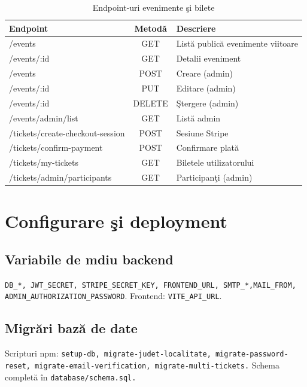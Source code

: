 \begin{table}[htbp]
	\centering
	\begin{tabular}{|>{\ttfamily}p{5cm}|c|l|}
		\hline
		\textbf{Endpoint} & \textbf{Metod\u a} & \textbf{Descriere} \\ \hline
		/events & GET & List\u a public\u a evenimente viitoare \\ \hline
		/events/:id & GET & Detalii eveniment \\ \hline
		/events & POST & Creare (admin) \\ \hline
		/events/:id & PUT & Editare (admin) \\ \hline
		/events/:id & DELETE & \c Stergere (admin) \\ \hline
		/events/admin/list & GET & List\u a admin \\ \hline
		/tickets/create-\newline checkout-session & POST & Sesiune Stripe \\ \hline
		/tickets/confirm-\newline payment & POST & Confirmare plat\u a \\ \hline
		/tickets/my-tickets & GET & Biletele utilizatorului \\ \hline
		/tickets/admin/\newline participants & GET & Participan\c ti (admin) \\ \hline
	\end{tabular}
	\caption{Endpoint-uri evenimente \c si bilete}
	\label{tab:endpoints_evenimente_bilete}
\end{table}

\section{Configurare \c si deployment}
\subsection{Variabile de mdiu backend}

\texttt{DB\_*, JWT\_SECRET, STRIPE\_SECRET\_KEY, FRONTEND\_URL, SMTP\_*,\linebreak MAIL\_FROM,
	ADMIN\_AUTHORIZATION\_PASSWORD}. Frontend: \texttt{VITE\_API\_URL}.

\subsection{Migr\u ari baz\u a de date}

Scripturi npm: \texttt{setup-db, migrate-judet-localitate, migrate-\linebreak password-reset, migrate-email-verification, migrate-\linebreak multi-tickets.} Schema complet\u a \^in \texttt{database/schema.sql.}

